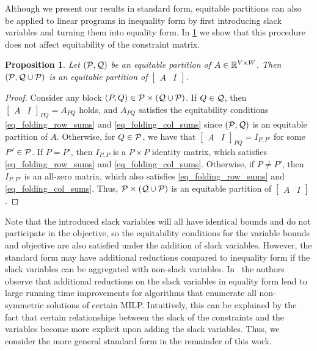 \documentclass[pdflatex,sn-mathphys-num]{sn-jnl}%
\theoremstyle{thmstyleone}%
\newtheorem{proposition}[proposition]{Proposition}
\theoremstyle{thmstylethree}%
\theoremstyle{thmstyletwo}%
\begin{document}
Although we present our results in standard form, equitable partitions can also be applied to linear programs in inequality form by first introducing slack variables and turning them into equality form. In \cref{thm_ineq_equivalent} we show that this procedure does not affect equitability of the constraint matrix. 
\begin{proposition}
    \label{thm_ineq_equivalent}
    Let $(\mathcal{P},\mathcal{Q})$ be an equitable partition of $A\in \mathbb{R}^{V\times W}$. Then $(\mathcal{P}, \mathcal{Q} \cup \mathcal{P})$ is an equitable partition of $\begin{bmatrix}
        A & I
    \end{bmatrix}$.
\end{proposition}
\begin{proof}
Consider any block $(P,Q) \in \mathcal{P}\times (\mathcal{Q} \cup \mathcal{P})$. If $Q \in \mathcal{Q}$, then $\begin{bmatrix}
    A & I 
\end{bmatrix}_{PQ} = A_{PQ}$ holds, and $A_{PQ}$ satisfies the equitability conditions \eqref{eq_folding_row_sums} and \eqref{eq_folding_col_sums} since $(\mathcal{P},\mathcal{Q})$ is an equitable partition of $A$. Otherwise, for $Q\in \mathcal{P}$, we have that $\begin{bmatrix}
    A & I 
\end{bmatrix}_{PQ} = I_{P,P'}$ for some $P'\in \mathcal{P}$. If $P= P'$, then $I_{P,P}$ is a $P\times P$ identity matrix, which satisfies \eqref{eq_folding_row_sums} and \eqref{eq_folding_col_sums}. Otherwise, if $P\neq P'$, then $I_{P,P'}$ is an all-zero matrix, which also satisfies \eqref{eq_folding_row_sums} and \eqref{eq_folding_col_sums}. Thus,  $\mathcal{P}\times (\mathcal{Q} \cup \mathcal{P})$ is an equitable partition of $\begin{bmatrix}
    A & I
\end{bmatrix}$. 
\end{proof}
Note that the introduced slack variables will all have identical bounds and do not participate in the objective, so the equitability conditions for the variable bounds and objective are also satisfied under the addition of slack variables. However, the standard form may have additional reductions compared to inequality form if the slack variables can be aggregated with non-slack variables. In~\cite{Geyer2019} the authors observe that additional reductions on the slack variables in equality form lead to large running time improvements for algorithms that enumerate all non-symmetric solutions of certain MILP. Intuitively, this can be explained by the fact that certain relationships between the slack of the constraints and the variables become more explicit upon adding the slack variables.
Thus, we consider the more general standard form in the remainder of this work.\\
\end{document}

